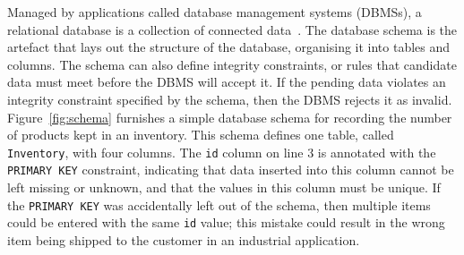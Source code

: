 



Managed by applications called database management systems (DBMSs), a relational database is a collection of connected
data~\cite{databasebook}. The database schema is the artefact that lays out the structure of the database, organising it
into tables and columns.  The schema can also define integrity constraints, or rules that candidate data must meet
before the DBMS will accept it. If the pending data violates an integrity constraint specified by the schema, then the
DBMS rejects it as invalid.  Figure~\ref{fig:schema} furnishes a simple database schema for recording the number of
products kept in an inventory. This schema defines one table, called \texttt{Inventory}, with four columns.  The
\texttt{id} column on line $3$ is annotated with the \texttt{PRIMARY KEY} constraint, indicating that data inserted
into this column cannot be left missing or unknown, and that the values in this column must be unique. If the
\texttt{PRIMARY KEY} was accidentally left out of the schema, then multiple items could be entered with the same
\texttt{id} value; this mistake could result in the wrong item being shipped to the customer in an industrial
application.
